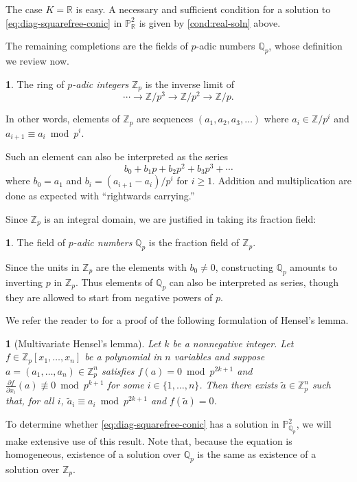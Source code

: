 \documentclass[10pt,a4paper]{amsart}
\numberwithin{equation}{section}
\numberwithin{figure}{section}
\numberwithin{table}{section}
\theoremstyle{definition}
\theoremstyle{plain}
\theoremstyle{remark}
\theoremstyle{plain}
\theoremstyle{definition}
\newtheorem{defn}[thm]{\protect\definitionname}
\theoremstyle{plain}
\theoremstyle{plain}
\newtheorem{lem}[thm]{\protect\lemmaname}
\providecommand{\definitionname}{Definition}
\providecommand{\lemmaname}{Lemma}
\renewcommand{\P}{\mathbb{P}}
\newcommand{\Z}{\mathbb{Z}}
\newcommand{\Q}{\mathbb{Q}}
\newcommand{\R}{\mathbb{R}}
\begin{document}
	The case $K=\R$ is easy. A necessary and sufficient condition for a solution 
	to \eqref{eq:diag-squarefree-conic} in $\P^2_\R$ is given by 
	\eqref{cond:real-soln} above.
	
	The remaining completions are the fields of $p$-adic numbers $\Q_p$, whose definition 
	we review now.
	\begin{defn}
		The ring of \emph{$p$-adic integers} $\Z_p$ is the inverse limit of
		\[
		\cdots \to \Z/p^3 \to \Z/p^2 \to \Z/p.
		\]
	\end{defn}
	In other words, elements of $\Z_p$ are sequences $(a_1,a_2,a_3,\ldots)$ where $a_i \in \Z/p^i$ and $a_{i+1} \equiv a_i\bmod {p^i}$.
	
	Such an element can also be interpreted as the series
	\[
	b_0 + b_1 p + b_2 p^2 + b_3 p^3 + \cdots
	\]
	where $b_0 = a_1$ and $b_i = (a_{i+1} - a_i)/p^i$ for $i \geq 1$. Addition and multiplication are done as expected with ``rightwards carrying.''
	
	Since $\Z_p$ is an integral domain, we are justified in taking its fraction field:
	\begin{defn}
		The field of \emph{$p$-adic numbers} $\Q_p$ is the fraction field of $\Z_p$.
	\end{defn}
	Since the units in $\Z_p$ are the elements with $b_0 \neq 0$, constructing $\Q_p$ amounts to inverting $p$ in $\Z_p$. Thus elements of $\Q_p$ can also be interpreted as series, though they are allowed to start from negative powers of $p$.
	
	We refer the reader to \cite[Thm.~6.7]{bilu} for a proof of the following formulation of Hensel's lemma.
	\begin{lem}[Multivariate Hensel's lemma]\label{thm:hensels-one-eq}
		Let $k$ be a nonnegative integer. Let $f \in \Z_p[x_1,\ldots,x_n]$ be a polynomial in $n$ variables and suppose $a = (a_1,\ldots,a_n)\in \Z_p^n$ satisfies $f(a) = 0 \bmod {p^{2k+1}}$ and $\frac{\partial f}{\partial x_i}(a) \not\equiv 0 \bmod {p^{k+1}}$ for some $i\in \{1,\ldots,n\}$. Then there exists $\widetilde{a} \in \Z_p^n$ such that, for all $i$, $\widetilde{a}_i\equiv a_i \bmod {p^{2k+1}}$ and $f(\widetilde{a}) = 0$.
	\end{lem}
	To determine whether \eqref{eq:diag-squarefree-conic} has a solution in $\P^2_{\Q_p}$, we will make extensive use of this result. Note that, because the equation is homogeneous, existence of a solution over $\Q_p$ is the same as existence of a solution over $\Z_p$.
	
\end{document}
